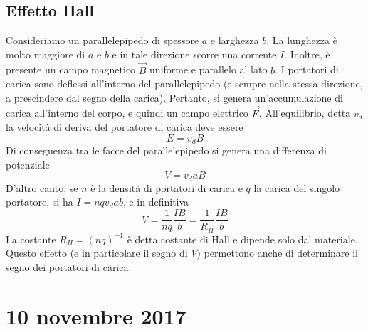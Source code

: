 \documentclass[a4paper,11pt]{book}
\theoremstyle{definition}
\theoremstyle{theorem}
\begin{document}
\subsection{Effetto Hall}
Consideriamo un parallelepipedo di spessore $a$ e larghezza $b$. La lunghezza è molto maggiore di $a$ e $b$ e in tale direzione scorre una corrente $I$. Inoltre, è presente un campo magnetico $\vec{B}$ uniforme e parallelo al lato $b$. I portatori di carica sono deflessi all'interno del parallelepipedo (e sempre nella stessa direzione, a prescindere dal segno della carica). Pertanto, si genera un'accumulazione di carica all'interno del corpo, e quindi un campo elettrico $\vec E$. All'equilibrio, detta $v_d$ la velocità di deriva del portatore di carica deve essere
\[E=v_dB\]
Di conseguenza tra le facce del parallelepipedo si genera una differenza di potenziale
\[V=v_daB\]
D'altro canto, se $n$ è la densità di portatori di carica e $q$ la carica del singolo portatore, si ha $I=nqv_dab$, e in definitiva
\[V=\frac{1}{nq}\frac{IB}{b}=\frac{1}{R_H}\frac{IB}{b}\]
La costante $R_H=(nq)^{-1}$ è detta costante di Hall e dipende solo dal materiale. Questo effetto (e in particolare il segno di $V$) permettono anche di determinare il segno dei portatori di carica.
\section{10 novembre 2017}
\end{document}
